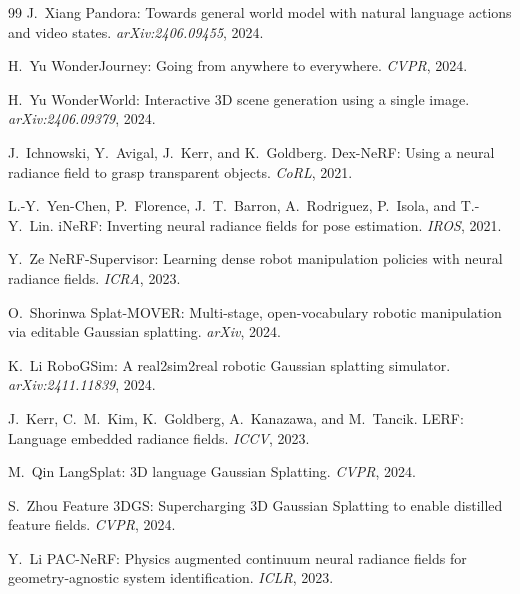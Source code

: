 \begin{thebibliography}{99}
J.~Xiang \etal
Pandora: Towards general world model with natural language actions and video
states.
\emph{arXiv:2406.09455}, 2024.


H.~Yu \etal
WonderJourney: Going from anywhere to everywhere.
\emph{CVPR}, 2024.


H.~Yu \etal
WonderWorld: Interactive 3D scene generation using a single image.
\emph{arXiv:2406.09379}, 2024.


J.~Ichnowski, Y.~Avigal, J.~Kerr, and K.~Goldberg.
Dex-NeRF: Using a neural radiance field to grasp transparent objects.
\emph{CoRL}, 2021.


L.-Y.~Yen-Chen, P.~Florence, J.~T.~Barron, A.~Rodriguez, P.~Isola, and
T.-Y.~Lin.
iNeRF: Inverting neural radiance fields for pose estimation.
\emph{IROS}, 2021.


Y.~Ze \etal
NeRF-Supervisor: Learning dense robot manipulation policies with neural
radiance fields.
\emph{ICRA}, 2023.


O.~Shorinwa \etal
Splat-MOVER: Multi-stage, open-vocabulary robotic manipulation via editable
Gaussian splatting.
\emph{arXiv}, 2024.


K.~Li \etal
RoboGSim: A real2sim2real robotic Gaussian splatting simulator.
\emph{arXiv:2411.11839}, 2024.


J.~Kerr, C.~M.~Kim, K.~Goldberg, A.~Kanazawa, and M.~Tancik.
LERF: Language embedded radiance fields.
\emph{ICCV}, 2023.


M.~Qin \etal
LangSplat: 3D language Gaussian Splatting.
\emph{CVPR}, 2024.


S.~Zhou \etal
Feature 3DGS: Supercharging 3D Gaussian Splatting to enable distilled feature fields.
\emph{CVPR}, 2024.


Y.~Li \etal
PAC-NeRF: Physics augmented continuum neural radiance fields for geometry-agnostic
system identification.
\emph{ICLR}, 2023.


\end{thebibliography}
